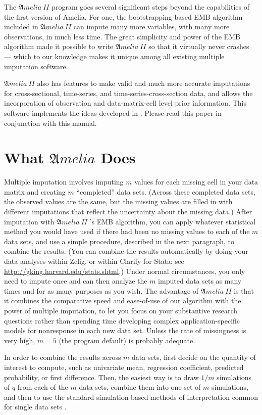 \documentclass[12pt,titlepage]{article}
\newcommand{\AmeliaII}{\ensuremath{\mathfrak Amelia~II} }
\begin{document}
The \AmeliaII program goes several significant steps beyond the
capabilities of the first version of Amelia.  For one, the
bootstrapping-based EMB algorithm included in \AmeliaII can impute many
more variables, with many more observations, in much less time.  The
great simplicity and power of the EMB algorithm made it possible to
write \AmeliaII so that it virtually never crashes --- which to our
knowledge makes it unique among all existing multiple imputation
software.  

\AmeliaII also has features to make valid and much more accurate
imputations for cross-sectional, time-series, and
time-series-cross-section data, and allows the incorporation of
observation and data-matrix-cell level prior information.  This
software implements the ideas developed in \citet*{HonKin09}.  Please
read this paper in conjunction with this manual.

\section{What ${\mathfrak Amelia}$ Does}
\label{sec:what}

Multiple imputation involves imputing $m$ values for each missing cell
in your data matrix and creating $m$ ``completed'' data sets.  (Across
these completed data sets, the observed values are the same, but the
missing values are filled in with different imputations that reflect
the uncertainty about the missing data.)  After imputation with
\AmeliaII's EMB algorithm, you can apply whatever statistical method
you would have used if there had been no missing values to each of the
$m$ data sets, and use a simple procedure, described in the next
paragraph, to combine the results.  (You can combine the results
automatically by doing your data analyses within Zelig, or within
Clarify for Stata; see \url{http://gking.harvard.edu/stats.shtml}.)
Under normal circumstances, you only need to impute once and can then
analyze the $m$ imputed data sets as many times and for as many
purposes as you wish.  The advantage of \AmeliaII is that it combines
the comparative speed and ease-of-use of our algorithm with the power
of multiple imputation, to let you focus on your substantive research
questions rather than spending time developing complex
application-specific models for nonresponse in each new data set.
Unless the rate of missingness is very high, $m = 5$ (the program
default) is probably adequate.

In order to combine the results across $m$ data sets, first decide on
the quantity of interest to compute, such as univariate mean,
regression coefficient, predicted probability, or first difference.
Then, the easiest way is to draw $1/m$ simulations of $q$ from each of
the $m$ data sets, combine them into one set of $m$ simulations, and
then to use the standard simulation-based methods of interpretation
common for single data sets \citep{KinTomWit00}.
\end{document}

